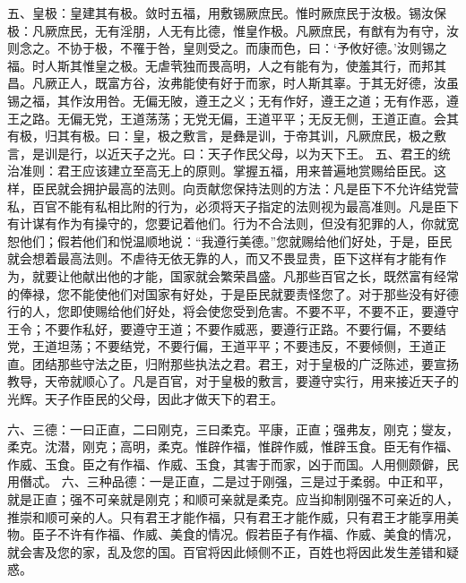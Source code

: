 \documentclass[12pt,UTF8]{ctexbook}
\begin{document}
五、皇极：皇建其有极。敛时五福，用敷锡厥庶民。惟时厥庶民于汝极。锡汝保极：凡厥庶民，无有淫朋，人无有比德，惟皇作极。凡厥庶民，有猷有为有守，汝则念之。不协于极，不罹于咎，皇则受之。而康而色，曰：‘予攸好德。’汝则锡之福。时人斯其惟皇之极。无虐茕独而畏高明，人之有能有为，使羞其行，而邦其昌。凡厥正人，既富方谷，汝弗能使有好于而家，时人斯其辜。于其无好德，汝虽锡之福，其作汝用咎。无偏无陂，遵王之义；无有作好，遵王之道；无有作恶，遵王之路。无偏无党，王道荡荡；无党无偏，王道平平；无反无侧，王道正直。会其有极，归其有极。曰：皇，极之敷言，是彝是训，于帝其训，凡厥庶民，极之敷言，是训是行，以近天子之光。曰：天子作民父母，以为天下王。
五、君王的统治准则：君王应该建立至高无上的原则。掌握五福，用来普遍地赏赐给臣民。这样，臣民就会拥护最高的法则。向贡献您保持法则的方法：凡是臣下不允许结党营私，百官不能有私相比附的行为，必须将天子指定的法则视为最高准则。凡是臣下有计谋有作为有操守的，您要记着他们。行为不合法则，但没有犯罪的人，你就宽恕他们；假若他们和悦温顺地说：“我遵行美德。”您就赐给他们好处，于是，臣民就会想着最高法则。不虐待无依无靠的人，而又不畏显贵，臣下这样有才能有作为，就要让他献出他的才能，国家就会繁荣昌盛。凡那些百官之长，既然富有经常的俸禄，您不能使他们对国家有好处，于是臣民就要责怪您了。对于那些没有好德行的人，您即使赐给他们好处，将会使您受到危害。不要不平，不要不正，要遵守王令；不要作私好，要遵守王道；不要作威恶，要遵行正路。不要行偏，不要结党，王道坦荡；不要结党，不要行偏，王道平平；不要违反，不要倾侧，王道正直。团结那些守法之臣，归附那些执法之君。君王，对于皇极的广泛陈述，要宣扬教导，天帝就顺心了。凡是百官，对于皇极的敷言，要遵守实行，用来接近天子的光辉。天子作臣民的父母，因此才做天下的君王。

六、三德：一曰正直，二曰刚克，三曰柔克。平康，正直；强弗友，刚克；燮友，柔克。沈潜，刚克；高明，柔克。惟辟作福，惟辟作威，惟辟玉食。臣无有作福、作威、玉食。臣之有作福、作威、玉食，其害于而家，凶于而国。人用侧颇僻，民用僭忒。
六、三种品德：一是正直，二是过于刚强，三是过于柔弱。中正和平，就是正直；强不可亲就是刚克；和顺可亲就是柔克。应当抑制刚强不可亲近的人，推崇和顺可亲的人。只有君王才能作福，只有君王才能作威，只有君王才能享用美物。臣子不许有作福、作威、美食的情况。假若臣子有作福、作威、美食的情况，就会害及您的家，乱及您的国。百官将因此倾侧不正，百姓也将因此发生差错和疑惑。
\end{document}
